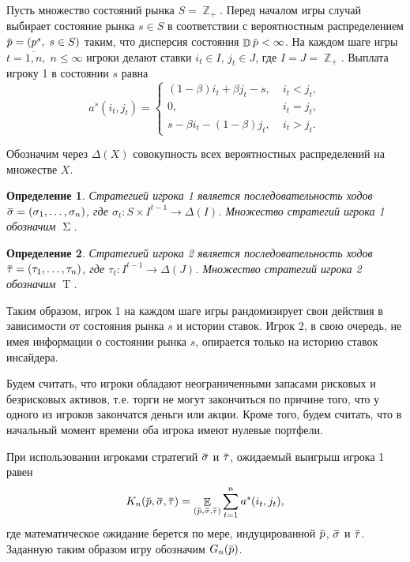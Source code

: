 \documentclass[12pt, draft]{extarticle}
\newtheorem{definition}{Определение}
\newcommand{\overbar}[1]%
{\mkern 1.5mu\overline{\mkern-1.3mu#1\mkern-1.3mu}\mkern 1.3mu}
\newcommand{\s}{\ensuremath{s}}
\newcommand{\p}{\ensuremath{\overbar{p}}}
\DeclareMathOperator{\E}{\mathbb{E}}
\DeclareMathOperator{\D}{\mathbb{D}}
\DeclareMathOperator{\Z}{\mathbb{Z}}
\newcommand{\G}[1][n]{\ensuremath{G_{#1}}}
\newcommand{\K}[1][n]{\ensuremath{K_{#1}}}
\DeclareMathOperator{\FPStrategies}{\Sigma}
\DeclareMathOperator{\SPStrategies}{\mathrm{T}}
\newcommand{\sigmav}{\ensuremath{\overbar{\sigma}}}
\newcommand{\tauv}{\ensuremath{\overbar{\tau}}}
\begin{document}
Пусть множество состояний рынка $S = \Z_+$. Перед началом игры случай выбирает
состояние рынка $\s \in S$ в соответствии с вероятностным распределением $\p =
(p^s, \; s \in S)$ таким, что дисперсия состояния $\D \p < \infty$. На каждом
шаге игры $t = \overline{1,n}, \; n \leqslant \infty$ игроки делают ставки $i_t
\in I, \, j_t \in J$, где $I = J = \Z_+$. Выплата игроку 1 в состоянии $s$ равна
\begin{equation*}
  a^s(i_t, j_t) =
  \begin{cases}
    (1-\beta) i_t + \beta j_t - s, &\; i_t < j_t, \\
    0, &\; i_t = j_t, \\
    s - \beta i_t - (1-\beta)j_t, &\; i_t > j_t.
  \end{cases}
\end{equation*}

Обозначим через $\Delta(X)$ совокупность всех вероятностных распределений на
множестве $X$.

\begin{definition}
  Стратегией игрока 1 является последовательность ходов $\sigmav = (\sigma_1,
  \ldots, \sigma_n)$, где $\sigma_t: S \times I^{t-1} \rightarrow \Delta(I)$.
  Множество стратегий игрока 1 обозначим $\FPStrategies$.
\end{definition}

\begin{definition}
  Стратегией игрока 2 является последовательность ходов $\tauv = (\tau_1,
  \ldots, \tau_n)$, где $\tau_t: I^{t-1} \rightarrow \Delta(J)$. Множество
  стратегий игрока 2 обозначим $\SPStrategies$.
\end{definition}

Таким образом, игрок 1 на каждом шаге игры рандомизирует свои действия в
зависимости от состояния рынка $s$ и истории ставок. Игрок 2, в свою очередь, не
имея информации о состоянии рынка $s$, опирается только на историю ставок
инсайдера.

Будем считать, что игроки обладают неограниченными запасами рисковых и
безрисковых активов, т.е. торги не могут закончиться по причине того, что у
одного из игроков закончатся деньги или акции. Кроме того, будем считать, что в
начальный момент времени оба игрока имеют нулевые портфели.

При использовании игроками стратегий $\sigmav$ и $\tauv$, ожидаемый выигрыш
игрока 1 равен
\begin{equation*}
  \K(\p, \sigmav, \tauv) =
  \E_{(\p, \sigmav, \tauv)} \sum_{t=1}^n a^s(i_t, j_t),
\end{equation*}
где математическое ожидание берется по мере, индуцированной $\p$, $\sigmav$ и
$\tauv$. Заданную таким образом игру обозначим $\G(\p)$.
\end{document}
